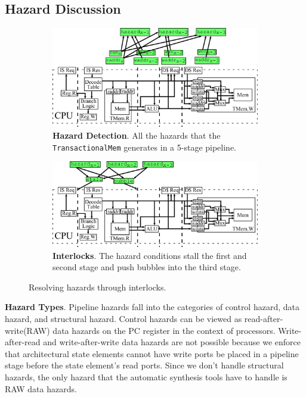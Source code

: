 \subsection{Hazard Discussion}
\begin{figure}[htb]
\centering
  \begin{subfigure}[t]{0.8\textwidth}
  \centering
  \includegraphics[width=\textwidth]{figures/pipelinehazard.pdf}
  \caption{{\bf Hazard Detection}. All the hazards that
    the {\tt TransactionalMem} generates in a 5-stage pipeline.}
  \label{fig:haz}
  \end{subfigure}
  \begin{subfigure}[t]{0.8\textwidth}
  \vspace{20pt}
  \centering
  \includegraphics[width=\textwidth]{figures/pipelineinterlock.pdf}
  \caption{{\bf Interlocks}. The hazard conditions stall the
  first and second stage and push bubbles into the third stage.}
  \label{fig:int}
  \end{subfigure}
\caption{Resolving hazards through interlocks.}
\label{fig:hazint}
\end{figure}

{\bf Hazard Types}. Pipeline hazards fall into the categories of
control hazard, data hazard, and structural hazard. Control hazards
can be viewed as read-after-write(RAW) data hazards on the PC register
in the context of processors. Write-after-read and write-after-write
data hazards are not possible because we enforce that architectural
state elements cannot have write ports be placed in a pipeline stage
before the state element's read ports. Since we don't handle structural
hazards, the only hazard that the automatic synthesis tools have to
handle is RAW data hazards.

